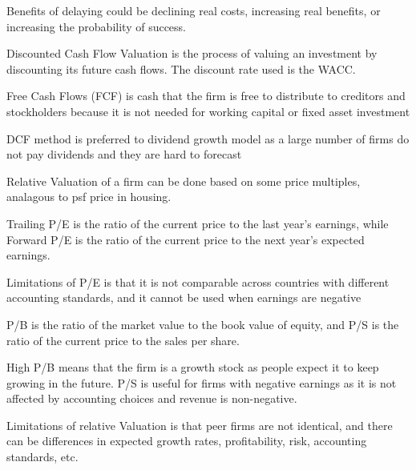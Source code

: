 Benefits of delaying could be declining real costs, increasing real benefits, or increasing the probability of success.


Discounted Cash Flow Valuation is the process of valuing an investment by discounting its future cash flows. The discount rate used is the WACC.

Free Cash Flows (FCF) is cash that the firm is free to distribute to creditors and stockholders because it is not needed for working capital or fixed asset investment

DCF method is preferred to dividend growth model as a large number of firms do not pay dividends and they are hard to forecast

Relative Valuation of a firm can be done based on some price multiples, analagous to psf price in housing.

Trailing P/E is the ratio of the current price to the last year's earnings, while Forward P/E is the ratio of the current price to the next year's expected earnings.

Limitations of P/E is that it is not comparable across countries with different accounting standards, and it cannot be used when earnings are negative

P/B is the ratio of the market value to the book value of equity, and P/S is the ratio of the current price to the sales per share.

High P/B means that the firm is a growth stock as people expect it to keep growing in the future. P/S is useful 
for firms with negative earnings as it is not affected by accounting choices and revenue is non-negative.

Limitations of relative Valuation is that peer firms are not identical, and there can be differences in expected growth rates,
profitability, risk, accounting standards, etc.

